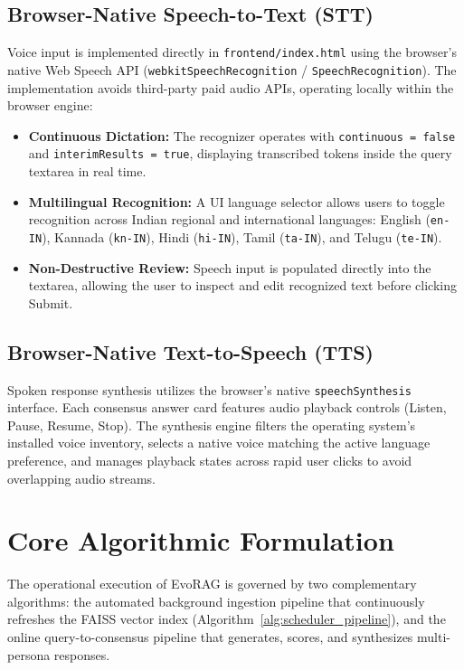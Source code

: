 \subsection{Browser-Native Speech-to-Text (STT)}
Voice input is implemented directly in \texttt{frontend/index.html} using the browser's native Web Speech API (\texttt{webkitSpeechRecognition} / \texttt{SpeechRecognition}). The implementation avoids third-party paid audio APIs, operating locally within the browser engine:
\begin{itemize}
    \item \textbf{Continuous Dictation:} The recognizer operates with \texttt{continuous = false} and \texttt{interimResults = true}, displaying transcribed tokens inside the query textarea in real time.
    \item \textbf{Multilingual Recognition:} A UI language selector allows users to toggle recognition across Indian regional and international languages: English (\texttt{en-IN}), Kannada (\texttt{kn-IN}), Hindi (\texttt{hi-IN}), Tamil (\texttt{ta-IN}), and Telugu (\texttt{te-IN}).
    \item \textbf{Non-Destructive Review:} Speech input is populated directly into the textarea, allowing the user to inspect and edit recognized text before clicking Submit.
\end{itemize}

\subsection{Browser-Native Text-to-Speech (TTS)}
Spoken response synthesis utilizes the browser's native \texttt{speechSynthesis} interface. Each consensus answer card features audio playback controls (Listen, Pause, Resume, Stop). The synthesis engine filters the operating system's installed voice inventory, selects a native voice matching the active language preference, and manages playback states across rapid user clicks to avoid overlapping audio streams.

\section{Core Algorithmic Formulation}
\label{sec:core_algorithms}

The operational execution of EvoRAG is governed by two complementary algorithms: the automated background ingestion pipeline that continuously refreshes the FAISS vector index (Algorithm~\ref{alg:scheduler_pipeline}), and the online query-to-consensus pipeline that generates, scores, and synthesizes multi-persona responses.


